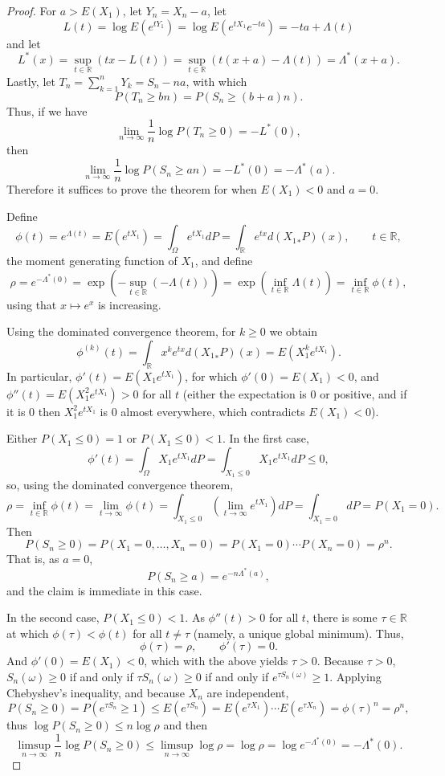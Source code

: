 \documentclass{article}
\theoremstyle{definition}
\theoremstyle{definition}
\begin{document}
\begin{proof}
For $a>E(X_1)$,
let $Y_n=X_n-a$, let
\[
L(t) = \log E(e^{tY_1}) = \log E(e^{tX_1}e^{-ta})=-ta+\Lambda(t)
\]
and let
\[
L^*(x) = \sup_{t \in \mathbb{R}} (tx-L(t)) = \sup_{t \in \mathbb{R}} (t(x+a)-\Lambda(t))
=\Lambda^*(x+a).
\]
Lastly, let $T_n=\sum_{k=1}^n Y_k=S_n - na$, with which
\[
P(T_n \geq bn) = P(S_n \geq (b+a)n).
\]
Thus, if we have
\[
\lim_{n \to \infty} \frac{1}{n} \log P(T_n \geq 0) = -L^*(0),
\]
then
\[
\lim_{n \to \infty} \frac{1}{n} \log P(S_n \geq an)=-L^*(0)
=-\Lambda^*(a).
\]
Therefore it suffices to prove the theorem for when $E(X_1)<0$ and
$a=0$. 



Define
\[
\phi(t) = e^{\Lambda(t)}=E(e^{tX_1}) = \int_\Omega e^{tX_1} dP = \int_\mathbb{R} e^{tx} d({X_1}_*P)(x), \qquad t \in \mathbb{R},
\]
the moment generating function of $X_1$,
and define 
\[
\rho = e^{-\Lambda^*(0)} = \exp\left( -\sup_{t \in \mathbb{R}}(-\Lambda(t))\right)
=\exp\left(\inf_{t \in \mathbb{R}} \Lambda(t) \right)
=\inf_{t \in \mathbb{R}} \phi(t),
\]
using that $x \mapsto e^x$ is increasing. 


Using the dominated convergence theorem, for $k \geq 0$ we obtain
\[
\phi^{(k)}(t) = \int_\mathbb{R} x^k e^{tx} d({X_1}_*P)(x)
=E(X_1^k e^{tX_1}).
\]
In particular, $\phi'(t)=E(X_1e^{tX_1})$, for which
$\phi'(0)=E(X_1)<0$, and $\phi''(t) = E(X_1^2 e^{tX_1})>0$ for all $t$ (either the expectation is $0$ or positive, and if it is $0$ then
$X_1^2 e^{tX_1}$ is $0$ almost everywhere, which contradicts $E(X_1)<0$).

Either $P(X_1 \leq 0)=1$ or $P(X_1 \leq 0)<1$. In the first case,
\[
\phi'(t) = \int_\Omega X_1 e^{tX_1} dP
=\int_{X_1 \leq 0} X_1 e^{tX_1} dP
\leq 0,
\]
so, using the dominated convergence theorem,
\[
\rho = \inf_{t \in \mathbb{R}} \phi(t) = \lim_{t \to \infty} \phi(t) = 
\int_{X_1 \leq 0} \left( \lim_{t \to \infty} e^{tX_1}\right) dP
=\int_{X_1=0} dP=P(X_1=0).
\]
Then 
\[
P(S_n \geq 0) = P(X_1=0,\ldots,X_n=0) = P(X_1=0) \cdots P(X_n=0)
=\rho^n.
\]
That is, as $a=0$,
\[
P(S_n \geq a)   = e^{-n\Lambda^*(a)},
\]
and the claim is immediate in this case.

In the second case, $P(X_1 \leq 0)<1$.  As $\phi''(t)>0$ for all $t$, there is some $\tau \in \mathbb{R}$ at
which $\phi(\tau)<\phi(t)$ for all $t \neq \tau$ (namely, a unique global minimum). Thus,
\[
\phi(\tau) = \rho, \qquad \phi'(\tau)=0.
\]
And $\phi'(0)=E(X_1)<0$, which with the above yields $\tau>0$.  
Because $\tau>0$, $S_n(\omega) \geq 0$ if and only if
$\tau S_n(\omega) \geq 0$ if and only if $e^{\tau S_n(\omega)} \geq 1$.  Applying Chebyshev's inequality, and because $X_n$ are independent,
\[
P(S_n \geq 0) = P(e^{\tau S_n}\geq 1) \leq E(e^{\tau S_n}) = E(e^{\tau X_1}) \cdots E(e^{\tau X_n})
=\phi(\tau)^n = \rho^n,
\]
thus $\log P(S_n \geq 0) \leq n \log \rho$ and then 
\[
\limsup_{n \to \infty} \frac{1}{n} \log P(S_n \geq 0) \leq \limsup_{n \to \infty} \log \rho = \log \rho
=\log e^{-\Lambda^*(0)}=-\Lambda^*(0).
\]


\end{proof}
\end{document}

